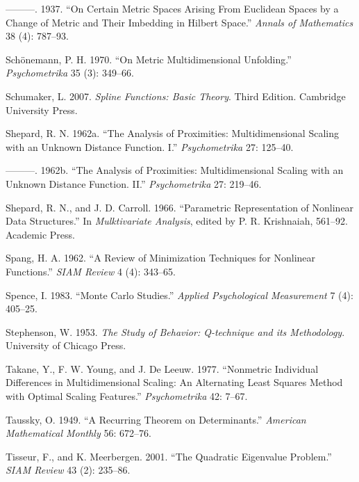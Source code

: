 \documentclass[
  12pt,
  letterpaper,
  DIV=11,
  numbers=noendperiod]{scrreprt}
\newlength{\cslhangindent}
\newenvironment{CSLReferences}[2] %
 {\begin{list}{}{%
  \setlength{\itemindent}{0pt}
  \setlength{\leftmargin}{0pt}
  \setlength{\parsep}{0pt}
  \ifodd #1
   \setlength{\leftmargin}{\cslhangindent}
   \setlength{\itemindent}{-1\cslhangindent}
  \fi
  \setlength{\itemsep}{#2\baselineskip}}}
 {\end{list}}
\theoremstyle{remark}
\begin{document}
\begin{CSLReferences}{1}{0}
---------. 1937. {``{On Certain Metric Spaces Arising From Euclidean
Spaces by a Change of Metric and Their Imbedding in Hilbert Space}.''}
\emph{Annals of Mathematics} 38 (4): 787--93.

Schönemann, P. H. 1970. {``{On Metric Multidimensional Unfolding}.''}
\emph{Psychometrika} 35 (3): 349--66.

Schumaker, L. 2007. \emph{{Spline Functions: Basic Theory}}. Third
Edition. Cambridge University Press.

Shepard, R. N. 1962a. {``{The Analysis of Proximities: Multidimensional
Scaling with an Unknown Distance Function. I}.''} \emph{Psychometrika}
27: 125--40.

---------. 1962b. {``{The Analysis of Proximities: Multidimensional
Scaling with an Unknown Distance Function. II}.''} \emph{Psychometrika}
27: 219--46.

Shepard, R. N., and J. D. Carroll. 1966. {``Parametric Representation of
Nonlinear Data Structures.''} In \emph{Mulktivariate Analysis}, edited
by P. R. Krishnaiah, 561--92. Academic Press.

Spang, H. A. 1962. {``{A Review of Minimization Techniques for Nonlinear
Functions}.''} \emph{SIAM Review} 4 (4): 343--65.

Spence, I. 1983. {``Monte Carlo Studies.''} \emph{Applied Psychological
Measurement} 7 (4): 405--25.

Stephenson, W. 1953. \emph{{The Study of Behavior: Q-technique and its
Methodology}}. University of Chicago Press.

Takane, Y., F. W. Young, and J. De Leeuw. 1977. {``Nonmetric Individual
Differences in Multidimensional Scaling: An Alternating Least Squares
Method with Optimal Scaling Features.''} \emph{Psychometrika} 42: 7--67.

Taussky, O. 1949. {``{A Recurring Theorem on Determinants}.''}
\emph{American Mathematical Monthly} 56: 672--76.

Tisseur, F., and K. Meerbergen. 2001. {``{The Quadratic Eigenvalue
Problem}.''} \emph{{SIAM} Review} 43 (2): 235--86.


\end{CSLReferences}
\end{document}
